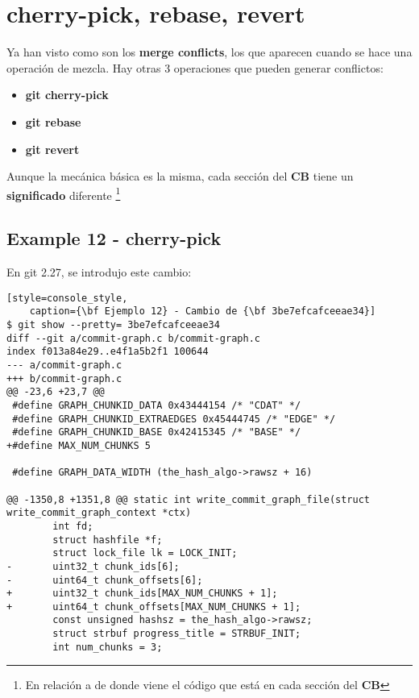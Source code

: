 
\section{cherry-pick, rebase, revert}
\label{other_ops}

Ya han visto como son los {\bf merge conflicts}, los que aparecen cuando se hace una operación de mezcla.
Hay otras 3 operaciones que pueden generar conflictos:

\begin{itemize}
	\item {\bf git cherry-pick}
	\item {\bf git rebase }
	\item {\bf git revert}
\end{itemize}

Aunque la mecánica básica es la misma, cada sección del {\bf CB} tiene un {\bf significado} diferente
\footnote{En relación a de donde viene el código que está en cada sección del {\bf CB}}

\subsection{Example 12 - cherry-pick}
\label{example_12}

En git 2.27, se introdujo este cambio:
\begin{lstlisting}[style=console_style,
	caption={\bf Ejemplo 12} - Cambio de {\bf 3be7efcafceeae34}]
$ git show --pretty= 3be7efcafceeae34
diff --git a/commit-graph.c b/commit-graph.c
index f013a84e29..e4f1a5b2f1 100644
--- a/commit-graph.c
+++ b/commit-graph.c
@@ -23,6 +23,7 @@
 #define GRAPH_CHUNKID_DATA 0x43444154 /* "CDAT" */
 #define GRAPH_CHUNKID_EXTRAEDGES 0x45444745 /* "EDGE" */
 #define GRAPH_CHUNKID_BASE 0x42415345 /* "BASE" */
+#define MAX_NUM_CHUNKS 5
 
 #define GRAPH_DATA_WIDTH (the_hash_algo->rawsz + 16)
 
@@ -1350,8 +1351,8 @@ static int write_commit_graph_file(struct write_commit_graph_context *ctx)
        int fd;
        struct hashfile *f;
        struct lock_file lk = LOCK_INIT;
-       uint32_t chunk_ids[6];
-       uint64_t chunk_offsets[6];
+       uint32_t chunk_ids[MAX_NUM_CHUNKS + 1];
+       uint64_t chunk_offsets[MAX_NUM_CHUNKS + 1];
        const unsigned hashsz = the_hash_algo->rawsz;
        struct strbuf progress_title = STRBUF_INIT;
        int num_chunks = 3;
\end{lstlisting}

